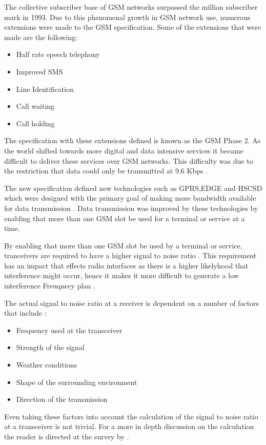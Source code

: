 The collective subscriber base of GSM networks surpassed the million subscriber mark in 1993. Due to this phenomenal growth in GSM network use, numerous extensions were made to the GSM specification. 
Some of the extensions that were made are the following\cite{Eisenblatter}:
\begin{itemize}
\item Half rate speech telephony
\item Improved SMS
\item Line Identification
\item Call waiting
\item Call holding
\end{itemize}
The specification with these extensions defined is known as the GSM Phase 2. As the world shifted towards more digital and data intensive services it became difficult to deliver these services over GSM networks. This difficulty was due to the restriction that data could only be transmitted at 9.6 Kbps \cite{GSM92}.

The new specification defined new technologies such as GPRS,EDGE and HSCSD which were designed with the primary goal of making more bandwidth available for data transmission \cite{GSMArchitectureProtocolsServices}. Data transmission was improved by these technologies by enabling that more than one GSM slot be used for a terminal or service at a time\cite{GSMArchitectureProtocolsServices}.

By enabling that more than one GSM slot be used by a terminal or service, tranceivers are required to have a higher signal to noise ratio \cite{GSMArchitectureProtocolsServices}. This requirement has an impact that effects radio interfaces as there is a higher likelyhood that interference might occur, hence it makes it more difficult to generate a low interference Freuqnecy plan \cite{Eisenblatter}. 

The actual signal to noise ratio at a receiver is dependent on a number of factors that include \cite{GSMArchitectureProtocolsServices,Karen2004}:
\begin{itemize}
\item Frequency used at the transceiver
\item Strength of the signal
\item Weather conditions
\item Shape of the surrounding environment
\item Direction of the transmission
\end{itemize}
Even taking these factors into account the calculation of the signal to noise ratio at a transceiver is not trivial. For a more in depth discussion on the calculation the reader is directed at the survey by \cite{Karen2004}.

